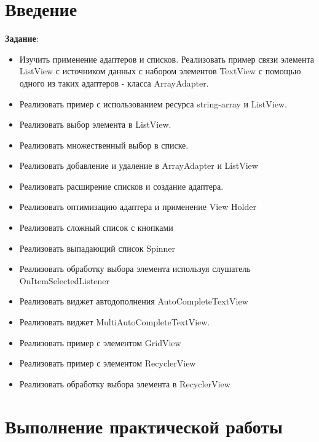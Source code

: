 
\section*{\LARGE{Введение}}

\textbf{Задание}:
\begin{itemize}
	\item Изучить применение адаптеров и списков. Реализовать пример связи
		элемента ListView с источником данных с набором элементов TextView с
		помощью одного из таких адаптеров - класса ArrayAdapter.
	\item Реализовать пример с использованием ресурса string-array и ListView.
	\item Реализовать выбор элемента в ListView.
	\item Реализовать множественный выбор в списке.
	\item Реализовать добавление и удаление в ArrayAdapter и ListView
	\item Реализовать расширение списков и создание адаптера.
	\item Реализовать оптимизацию адаптера и применение View Holder
	\item Реализовать сложный список с кнопками
	\item Реализовать выпадающий список Spinner
	\item Реализовать обработку выбора элемента используя слушатель
		OnItemSelectedListener
	\item Реализовать виджет автодополнения AutoCompleteTextView
	\item Реализовать виджет MultiAutoCompleteTextView.
	\item Реализовать пример с элементом GridView
	\item Реализовать пример с элементом RecyclerView
	\item Реализовать обработку выбора элемента в RecyclerView
\end{itemize}

\clearpage

\section*{\LARGE{Выполнение практической работы}}

